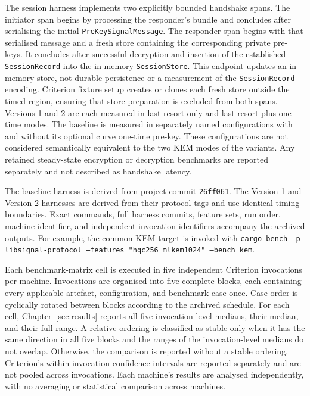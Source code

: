 The session harness implements two explicitly bounded handshake spans. The initiator span begins by processing the responder's bundle and concludes after serialising the initial \texttt{PreKeySignalMessage}. The responder span begins with that serialised message and a fresh store containing the corresponding private pre-keys. It concludes after successful decryption and insertion of the established \texttt{SessionRecord} into the in-memory \texttt{SessionStore}. This endpoint updates an in-memory store, not durable persistence or a measurement of the \texttt{SessionRecord} encoding. Criterion fixture setup creates or clones each fresh store outside the timed region, ensuring that store preparation is excluded from both spans. Versions 1 and 2 are each measured in last-resort-only and last-resort-plus-one-time modes. The baseline is measured in separately named configurations with and without its optional curve one-time pre-key. These configurations are not considered semantically equivalent to the two KEM modes of the variants. Any retained steady-state encryption or decryption benchmarks are reported separately and not described as handshake latency.

The baseline harness is derived from project commit \texttt{26ff061}. The Version 1 and Version 2 harnesses are derived from their protocol tags and use identical timing boundaries. Exact commands, full harness commits, feature sets, run order, machine identifier, and independent invocation identifiers accompany the archived outputs. For example, the common KEM target is invoked with \texttt{cargo bench -p libsignal-protocol --features "hqc256 mlkem1024" --bench kem}.

Each benchmark-matrix cell is executed in five independent Criterion invocations per machine. Invocations are organised into five complete blocks, each containing every applicable artefact, configuration, and benchmark case once. Case order is cyclically rotated between blocks according to the archived schedule. For each cell, Chapter~\ref{sec:results} reports all five invocation-level medians, their median, and their full range. A relative ordering is classified as stable only when it has the same direction in all five blocks and the ranges of the invocation-level medians do not overlap. Otherwise, the comparison is reported without a stable ordering. Criterion's within-invocation confidence intervals are reported separately and are not pooled across invocations. Each machine's results are analysed independently, with no averaging or statistical comparison across machines.

